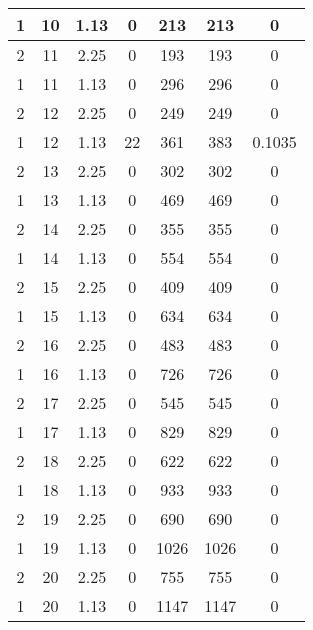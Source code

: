 \documentclass[letterpaper, 12pt]{article}
\begin{document}
\begin{longtable}{|c|c|c|c|c|c|c|}
\hline
1 & 10 & 1.13 & 0 & 213 & 213 & 0 \\
\hline
2 & 11 & 2.25 & 0 & 193 & 193 & 0 \\
\hline
1 & 11 & 1.13 & 0 & 296 & 296 & 0 \\
\hline
2 & 12 & 2.25 & 0 & 249 & 249 & 0 \\
\hline
1 & 12 & 1.13 & 22 & 361 & 383 & 0.1035 \\
\hline
2 & 13 & 2.25 & 0 & 302 & 302 & 0 \\
\hline
1 & 13 & 1.13 & 0 & 469 & 469 & 0 \\
\hline
2 & 14 & 2.25 & 0 & 355 & 355 & 0 \\
\hline
1 & 14 & 1.13 & 0 & 554 & 554 & 0 \\
\hline
2 & 15 & 2.25 & 0 & 409 & 409 & 0 \\
\hline
1 & 15 & 1.13 & 0 & 634 & 634 & 0 \\
\hline
2 & 16 & 2.25 & 0 & 483 & 483 & 0 \\
\hline
1 & 16 & 1.13 & 0 & 726 & 726 & 0 \\
\hline
2 & 17 & 2.25 & 0 & 545 & 545 & 0 \\
\hline
1 & 17 & 1.13 & 0 & 829 & 829 & 0 \\
\hline
2 & 18 & 2.25 & 0 & 622 & 622 & 0 \\
\hline
1 & 18 & 1.13 & 0 & 933 & 933 & 0 \\
\hline
2 & 19 & 2.25 & 0 & 690 & 690 & 0 \\
\hline
1 & 19 & 1.13 & 0 & 1026 & 1026 & 0 \\
\hline
2 & 20 & 2.25 & 0 & 755 & 755 & 0 \\
\hline
1 & 20 & 1.13 & 0 & 1147 & 1147 & 0 \\
\hline
\end{longtable}
\end{document}
